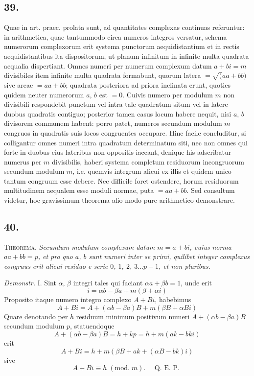 \documentclass[twoside,12pt, showframe]{memoir}
\renewcommand{\pmod}[1]{\;(\textrm{mod.}\;#1)}
\begin{document}
\subsection*{39.}
 
Quae in art. praec. prolata sunt, ad quantitates complexas continuas referuntur: in arithmetica, quae tantummodo circa numeros integros versatur, schema numerorum complexorum erit systema punctorum aequidistantium et in rectis aequidistantibus ita dispositorum, ut planum infinitum in infinite multa quadrata aequalia dispertiant. Omnes numeri per numerum complexum datum \(a+b i=m\) divisibiles item infinite multa quadrata formabunt, quorum latera \(=\surd(a a+b b)\) sive areae \(=a a+b b\); quadrata posteriora ad priora inclinata erunt, quoties quidem neuter numerorum \(a\), \(b\) est \(=0\). Cuivis numero per modulum \(m\) non divisibili respondebit punctum vel intra tale quadratum situm vel in latere duobus quadratis contiguo; posterior tamen casus locum habere nequit, nisi \(a\), \(b\) divisorem communem habent: porro patet, numeros secundum modulum \(m\) congruos in quadratis suis locos congruentes occupare. Hinc facile concluditur, si colligantur omnes numeri intra quadratum determinatum siti, nec non omnes qui forte in duobus eius lateribus non oppositis iaceant, denique his adscribatur numerus per \(m\) divisibilis, haberi systema completum residuorum incongruorum secundum modulum \(m\), i.e. quemvis integrum alicui ex illis et quidem unico tantum congruum esse debere. Nec difficile foret ostendere, horum residuorum multitudinem aequalem esse moduli normae, puta \(=a a+b b\). Sed consultum videtur, hoc gravissimum theorema alio modo pure arithmetico demonstrare.

\subsection*{40.}
 
\textsc{Theorema.} \textit{Secundum modulum complexum datum \(m=a+b i\), cuius norma \(a a+b b=p\), et pro quo \(a\), \(b\) sunt numeri inter se primi, quilibet integer complexus congruus erit alicui residuo e serie \(0\), \(1\), \(2\), \(3 \ldots p-1\), et non pluribus.}\clearpage\noindent%
 
\textit{Demonstr.} I. Sint \(\alpha\), \(\beta\) integri tales qui faciant \(\alpha a+\beta b=1\), unde erit
\[i=\alpha b- \beta a+m(\beta+\alpha i)\]
Proposito itaque numero integro complexo \(A+B i\), habebimus
\[A+B i=A+(\alpha b-\beta a) B+m(\beta B+\alpha B i)\]
Quare denotando per \(h\) residuum minimum positivum numeri \(A+(\alpha b-\beta a) B\) secundum modulum \(p\), statuendoque
\[A+(\alpha b-\beta a) B=h+k p=h+m(a k-b k i)\]
erit
\[A+B i=h+m(\beta B+a k+(\alpha B-b k) i)\]
sive
\[A+B i \equiv h\pmod{m} . \quad \text{ Q. E. P. }\]
 
\end{document}
